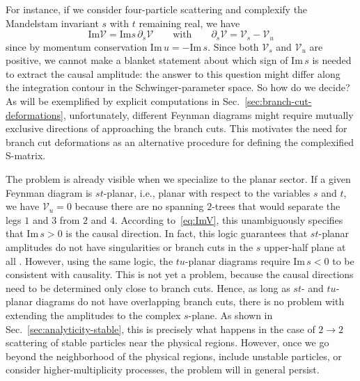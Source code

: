 \documentclass[12pt]{article}
\numberwithin{figure}{section}
\def \be {\begin{equation}}
\def \ee {\end{equation}}
\def \V {\mathcal{V}}
\def \Im {\mathrm{Im}}
\begin{document}
	For instance, if we consider four-particle scattering and complexify the Mandelstam invariant $s$ with $t$ remaining real, we have
	\be\label{eq:ImV2}
	\Im \V = \Im s\, \partial_s \V \qquad\text{with}\qquad \partial_s \V = \V_s - \V_u
	\ee
	since by momentum conservation $\Im\, u = - \Im\, s$. Since both $\V_s$ and $\V_u$ are positive, we cannot make a blanket statement about which sign of $\Im\, s$ is needed to extract the causal amplitude: the answer to this question might differ along the integration contour in the Schwinger-parameter space. So how do we decide? As will be exemplified by explicit computations in Sec.~\ref{sec:branch-cut-deformations}, unfortunately, different Feynman diagrams might require mutually exclusive directions of approaching the branch cuts. This motivates the need for branch cut deformations as an alternative procedure for defining the complexified S-matrix.
	
	The problem is already visible when we specialize to the planar sector. If a given Feynman diagram is $st$-planar, i.e., planar with respect to the variables $s$ and $t$, we have $\V_u=0$ because there are no spanning $2$-trees that would separate the legs $1$ and $3$ from $2$ and $4$. According to~\eqref{eq:ImV}, this unambiguously specifies that $\Im\, s > 0$ is the causal direction. In fact, this logic guarantees that $st$-planar amplitudes do not have singularities or branch cuts in the $s$ upper-half plane at all \cite{Mizera:2021fap}. However, using the same logic, the $tu$-planar diagrams require $\Im\, s <0$ to be consistent with causality. This is not yet a problem, because the causal directions need to be determined only close to branch cuts. Hence, as long as $st$- and $tu$-planar diagrams do not have overlapping branch cuts, there is no problem with extending the amplitudes to the complex $s$-plane. As shown in Sec.~\ref{sec:analyticity-stable}, this is precisely what happens in the case of $2\to2$ scattering of stable particles near the physical regions. However, once we go beyond the neighborhood of the physical regions, include unstable particles, or consider higher-multiplicity processes, the problem will in general persist.
	
\end{document}
